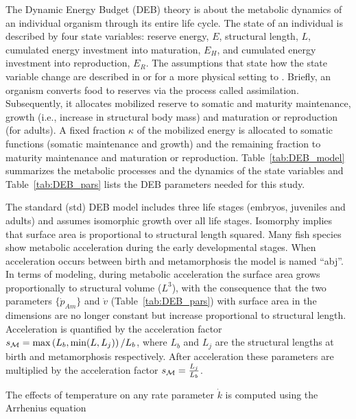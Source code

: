 \documentclass{article}
\begin{document}
The Dynamic Energy Budget (DEB) theory is about the metabolic dynamics of an individual organism through its entire life cycle. The state of an individual is described by four state variables: reserve energy, $E$, structural length, $L$, cumulated energy investment into maturation, $E_H$, and cumulated energy investment into reproduction, $E_R$. The assumptions that state how the state variable change are described in  \citep{Kooy2012} or for a more physical setting to \citep{JusuSous2017}. 
Briefly, an organism converts food to reserves via the process called assimilation.  Subsequently, it allocates mobilized reserve to somatic and maturity maintenance, growth (i.e., increase in structural body mass) and maturation or reproduction (for adults). A fixed fraction $\kappa$ of the mobilized energy is allocated to somatic functions (somatic maintenance and growth) and the remaining fraction to maturity maintenance and maturation or reproduction. Table~\ref{tab:DEB_model} summarizes the metabolic processes and the dynamics of the state variables and Table~\ref{tab:DEB_pars} lists the  DEB parameters needed for this study.

The standard (std) DEB model includes three life stages (embryos, juveniles and adults) and assumes isomorphic growth over all life stages. Isomorphy implies that surface area is proportional to structural length squared. Many fish species show metabolic acceleration during the early developmental stages. When acceleration occurs between birth and metamorphosis the model is named ``abj''. In terms of modeling, during metabolic acceleration the surface area grows proportionally to structural volume ($L^3$), with the consequence that the two parameters $\{ \dot{p}_{Am} \}$ and $\dot{v}$ (Table~\ref{tab:DEB_pars}) with surface area in the dimensions are no longer constant but increase proportional to structural length. Acceleration is quantified by the acceleration factor $s_{\cal M} =\max \left( L_b, \min(L,L_j) \right)/L_b$, where $L_b$ and $L_j$ are the structural lengths at birth and metamorphosis respectively.  After acceleration these parameters are multiplied by the acceleration factor $s_{\cal M} = \frac{L_j}{L_b}$.

The effects of temperature on any rate parameter $\dot{k}$ is computed using the Arrhenius equation
\end{document}
